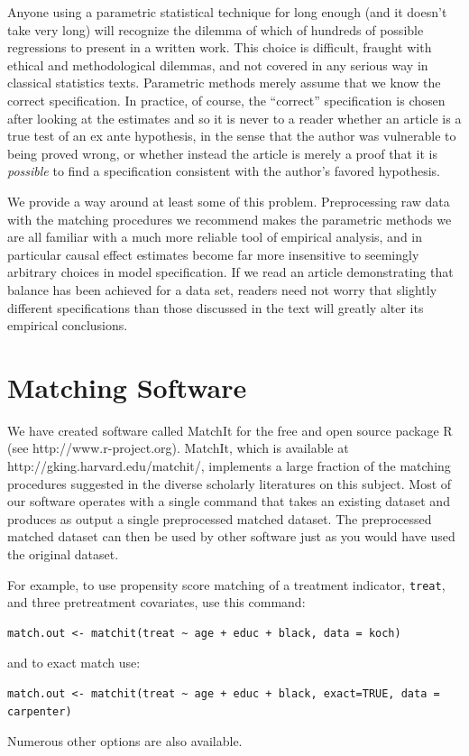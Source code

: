 \documentclass[11pt,titlepage]{article}
\begin{document}
Anyone using a parametric statistical technique for long enough (and
it doesn't take very long) will recognize the dilemma of which of
hundreds of possible regressions to present in a written work.  This
choice is difficult, fraught with ethical and methodological dilemmas,
and not covered in any serious way in classical statistics texts.
Parametric methods merely assume that we know the correct
specification.  In practice, of course, the ``correct'' specification
is chosen after looking at the estimates and so it is never to a
reader whether an article is a true test of an ex ante hypothesis, in
the sense that the author was vulnerable to being proved wrong, or
whether instead the article is merely a proof that it is
\emph{possible} to find a specification consistent with the author's
favored hypothesis.

We provide a way around at least some of this problem.  Preprocessing
raw data with the matching procedures we recommend makes the
parametric methods we are all familiar with a much more reliable tool
of empirical analysis, and in particular causal effect estimates
become far more insensitive to seemingly arbitrary choices in model
specification.  If we read an article demonstrating that balance has
been achieved for a data set, readers need not worry that slightly
different specifications than those discussed in the text will greatly
alter its empirical conclusions.

\appendix
\section{Matching Software}\label{s:matchit}

We have created software called MatchIt for the free and open source
package R (see http://www.r-project.org).  MatchIt, which is available
at http://gking.harvard.edu/matchit/, implements a large fraction of
the matching procedures suggested in the diverse scholarly literatures
on this subject.  Most of our software operates with a single command
that takes an existing dataset and produces as output a single
preprocessed matched dataset.  The preprocessed matched dataset can
then be used by other software just as you would have used the
original dataset.

For example, to use propensity score matching of a treatment
indicator, \texttt{treat}, and three pretreatment covariates, use this
command:
\begin{verbatim}
match.out <- matchit(treat ~ age + educ + black, data = koch)
\end{verbatim}
and to exact match use:
\begin{verbatim}
match.out <- matchit(treat ~ age + educ + black, exact=TRUE, data = carpenter)
\end{verbatim}
Numerous other options are also available.
\end{document}
